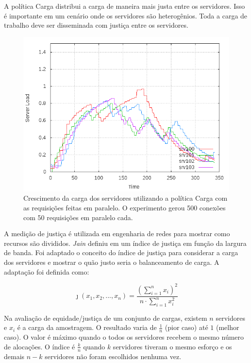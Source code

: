 A política Carga distribui a carga de maneira mais justa entre os servidores.
Isso é importante em um cenário onde os servidores são heterogênios.
Toda a carga de trabalho deve ser disseminada com justiça entre os servidores.

\begin{figure}[htb!]
    \centering
    \includegraphics[width=\linewidth]{img/balancer-parallel-load}
    \caption{Crescimento da carga dos servidores utilizando a política Carga
    com as requisições feitas em paralelo. O experimento gerou 500 conexões
    com 50 requisições em paralelo cada.}
    \label{fig:balancer-parallel-load}
\end{figure}

A medição de justiça é utilizada em engenharia de redes para mostrar como 
recursos são divididos.
\emph{Jain} definiu em \citep{jain} um índice de justiça em função da 
largura de banda.
Foi adaptado o conceito do índice de justiça para considerar a carga dos 
servidores e mostrar o quão justo seria o balanceamento de carga.
A adaptação foi definida como:


\[\jmath \left ( x_1, x_2,..., x_n \right ) = \frac{\left ( \sum_{i=1}^{n} x_i\right )^2}{n \cdot \sum_{i=1}^{n} x_i^2}\]

Na avaliação de equidade/justiça de um conjunto de cargas, existem $n$
servidores e $x_i$ é a carga da amostragem.
O resultado varia de $\frac{1}{n}$ (pior caso) até $1$ (melhor caso).
O valor é máximo quando o todos os servidores recebem o mesmo número de 
alocações.
O índice é $\frac{k}{n}$ quando $k$ servidores tiveram o mesmo esforço e 
os demais $n-k$ servidores não foram escolhidos nenhuma vez. 

